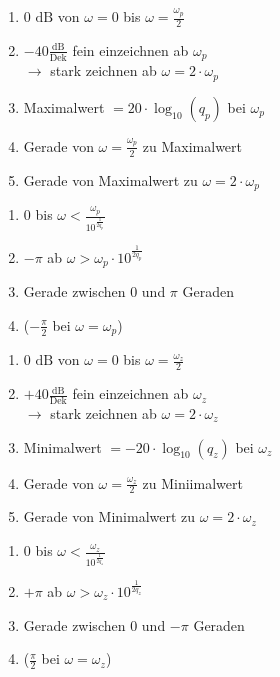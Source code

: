 \begin{minipage}[t]{0.48\columnwidth}
        \begin{enumerate}
            \item 0 $\text{dB}$ von $\omega=0$ bis $\omega=\frac{\omega_p}{2}$
            \item $-40\frac{\text{dB}}{\text{Dek}}$ fein einzeichnen ab $\omega_p$\\
            $\rightarrow$ stark zeichnen ab $\omega = 2 \cdot \omega_p$
            \item Maximalwert $= 20\cdot \log_{10}(q_p)$ bei $\omega_p$
            \item Gerade von $\omega=\frac{\omega_p}{2}$ zu Maximalwert 
            \item Gerade von Maximalwert zu $\omega = 2 \cdot \omega_p$
        \end{enumerate}
        \begin{enumerate}
            \item 0 bis $\omega < \frac{\omega_p}{10^{\frac{1}{2 q_p}}}$
            \item $- \pi$ ab $\omega > \omega_p \cdot 10^{\frac{1}{2 q_p}}$
            \item Gerade zwischen $0$ und $\pi$ Geraden
            \item ($- \frac{\pi}{2}$ bei $\omega = \omega_p$)
        \end{enumerate}
\end{minipage}
\hfill
\begin{minipage}[t]{0.48\columnwidth}
        \begin{enumerate}
            \item 0 $\text{dB}$ von $\omega=0$ bis $\omega=\frac{\omega_z}{2}$
            \item $+40\frac{\text{dB}}{\text{Dek}}$ fein einzeichnen ab $\omega_z$\\
            $\rightarrow$ stark zeichnen ab $\omega = 2 \cdot \omega_z$
            \item Minimalwert $= -20\cdot \log_{10}(q_z)$ bei $\omega_z$
            \item Gerade von $\omega=\frac{\omega_z}{2}$ zu Miniimalwert 
            \item Gerade von Minimalwert zu $\omega = 2 \cdot \omega_z$
        \end{enumerate}
        \begin{enumerate}
            \item 0 bis $\omega < \frac{\omega_z}{10^{\frac{1}{2 q_z}}}$
            \item $+ \pi$ ab $\omega > \omega_z \cdot 10^{\frac{1}{2 q_z}}$
            \item Gerade zwischen $0$ und $- \pi$ Geraden
            \item ($\frac{\pi}{2}$ bei $\omega = \omega_z$)
        \end{enumerate}
\end{minipage}


